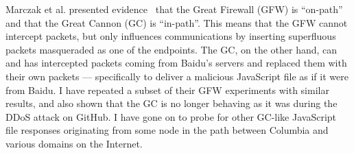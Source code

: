 Marczak et al. presented evidence~\cite{Marczak2015} that the Great Firewall (GFW) is “on-path” and that the Great Cannon (GC) is “in-path”.
This means that the GFW cannot intercept packets, but only influences communications by inserting superfluous packets masqueraded as one of the endpoints.
The GC, on the other hand, can and has intercepted packets coming from Baidu’s servers and replaced them with their own packets --– specifically to deliver a malicious JavaScript file as if it were from Baidu.
I have repeated a subset of their GFW experiments with similar results, and also shown that the GC is no longer behaving as it was during the DDoS attack on GitHub.
I have gone on to probe for other GC-like JavaScript file responses originating from some node in the path between Columbia and various domains on the Internet.